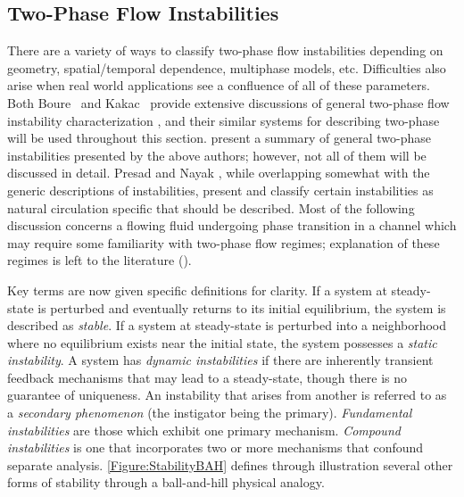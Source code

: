 \subsection{Two-Phase Flow Instabilities}
There are a variety of ways to classify two-phase flow instabilities depending on geometry, spatial/temporal dependence, multiphase models, etc.
Difficulties also arise when real world applications see a confluence of all of these parameters.
Both Boure \etal\ and Kakac \etal\ provide extensive discussions of general two-phase flow instability characterization \cite{boure_review_1973,kakac_review_2008}, and their similar systems for describing two-phase will be used throughout this section.
 present a summary of general two-phase instabilities presented by the above authors; however, not all of them will be discussed in detail.
Presad \etal \cite{durgaprasad_review_2007} and Nayak \etal \cite{nayak_flow_2008}, while overlapping somewhat with the generic descriptions of instabilities, present and classify certain instabilities as natural circulation specific that should be described.
Most of the following discussion concerns a flowing fluid undergoing phase transition in a channel which may require some familiarity with two-phase flow regimes; explanation of these regimes is left to the literature (\eg \cite{thome_chapter_2004,tong_boiling_1997,ghiaasiaan_twophase_2007}).


Key terms are now given specific definitions for clarity.
If a system at steady-state is perturbed and eventually returns to its initial equilibrium, the system is described as \textit{stable}.
If a system at steady-state is perturbed into a neighborhood where no equilibrium exists near the initial state, the system possesses a \textit{static instability}.
A system has \textit{dynamic instabilities} if there are inherently transient feedback mechanisms that may lead to a steady-state, though there is no guarantee of uniqueness.
An instability that arises from another is referred to as a \textit{secondary phenomenon} (the instigator being the primary).
\textit{Fundamental instabilities} are those which exhibit one primary mechanism.
\textit{Compound instabilities} is one that incorporates two or more mechanisms that confound separate analysis.
\cref{Figure:StabilityBAH} defines through illustration several other forms of stability through a ball-and-hill physical analogy.

